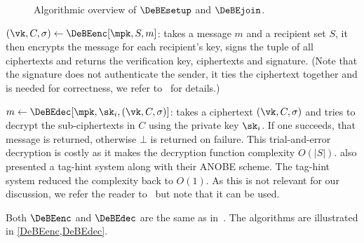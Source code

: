 \begin{figure}
  \caption{\label{DeBEsetup}\label{DeBEjoin}%
    Algorithmic overview of \(\DeBEsetup\) and \(\DeBEjoin\).
  }
\end{figure}


\((\vk, C, \sigma)\gets \DeBEenc[\mpk, S, m]\):
takes a message \(m\) and a recipient set \(S\), it then encrypts the message 
for each recipient's key, signs the tuple of all ciphertexts and returns the 
verification key, ciphertexts and signature.
(Note that the signature does not authenticate the sender, it ties the 
ciphertext together and is needed for correctness, we refer to~\cite{ANOBE} for 
details.)

\(m\gets \DeBEdec[\mpk, \sk_i, (\vk, C, \sigma)]\):
takes a ciphertext \((\vk, C, \sigma)\) and tries to decrypt the sub-ciphertexts 
in \(C\) using the private key \(\sk_i\).
If one succeeds, that message is returned, otherwise \(\bot\) is returned on 
failure.
This trial-and-error decryption is costly as it makes the decryption function 
complexity \(O(|S|)\).
\textcite{ANOBE} also presented a tag-hint system along with their \ac{ANOBE} 
scheme.
The tag-hint system reduced the complexity back to \(O(1)\).
As this is not relevant for our discussion, we refer the reader to~\cite{ANOBE} 
but note that it can be used.

Both \(\DeBEenc\) and \(\DeBEdec\) are the same as in~\cite{ANOBE}.
The algorithms are illustrated in \cref{DeBEenc,DeBEdec}.

